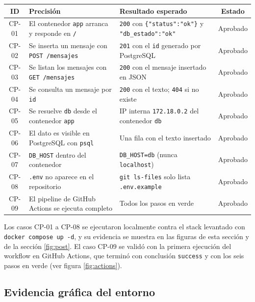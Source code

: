 \documentclass[12pt,a4paper]{article}
\begin{document}
\begin{center}
\small
\begin{tabularx}{\textwidth}{@{}c >{\small}X >{\small}X c@{}}
\toprule
\textbf{ID} & \textbf{Precisi\'on} & \textbf{Resultado esperado} & \textbf{Estado} \\
\midrule
CP-01 & El contenedor \texttt{app} arranca y responde en \texttt{/} & \texttt{200} con \texttt{\{"status":"ok"\}} y \texttt{"db\_estado":"ok"} & Aprobado \\
CP-02 & Se inserta un mensaje con \texttt{POST /mensajes} & \texttt{201} con el \texttt{id} generado por PostgreSQL & Aprobado \\
CP-03 & Se listan los mensajes con \texttt{GET /mensajes} & \texttt{200} con el mensaje insertado en JSON & Aprobado \\
CP-04 & Se consulta un mensaje por \texttt{id} & \texttt{200} con el texto; \texttt{404} si no existe & Aprobado \\
CP-05 & Se resuelve \texttt{db} desde el contenedor \texttt{app} & IP interna \texttt{172.18.0.2} del contenedor \texttt{db} & Aprobado \\
CP-06 & El dato es visible en PostgreSQL con \texttt{psql} & Una fila con el texto insertado & Aprobado \\
CP-07 & \texttt{DB\_HOST} dentro del contenedor & \texttt{DB\_HOST=db} (nunca \texttt{localhost}) & Aprobado \\
CP-08 & \texttt{.env} no aparece en el repositorio & \texttt{git ls-files} solo lista \texttt{.env.example} & Aprobado \\
CP-09 & El pipeline de GitHub Actions se ejecuta completo & Todos los pasos en verde & Aprobado \\
\bottomrule
\end{tabularx}
\end{center}

Los casos CP-01 a CP-08 se ejecutaron localmente contra el stack levantado con
\texttt{docker compose up -d}, y su evidencia se muestra en las figuras de esta secci\'on y
de la secci\'on \ref{fig:post}. El caso CP-09 se valid\'o con la primera ejecuci\'on del
workflow en GitHub Actions, que termin\'o con conclusi\'on \texttt{success} y con los seis
pasos en verde (ver figura \ref{fig:actions}).

\subsection{Evidencia gr\'afica del entorno}
\end{document}
